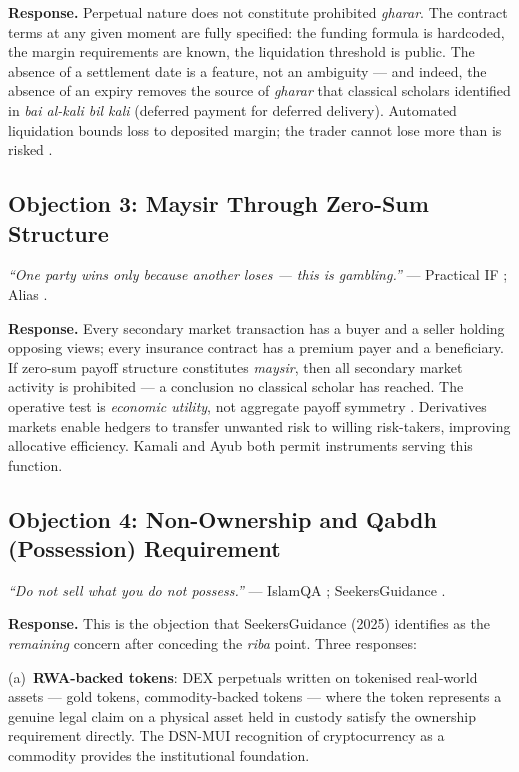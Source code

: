 \documentclass[10pt,twocolumn]{article}
\begin{document}
\textbf{Response.} Perpetual nature does not constitute prohibited
\textit{gharar}. The contract terms at any given moment are fully specified: the
funding formula is hardcoded, the margin requirements are known, the liquidation
threshold is public. The absence of a settlement date is a feature, not an
ambiguity --- and indeed, the absence of an expiry removes the source of
\textit{gharar} that classical scholars identified in \textit{bai al-kali bil
kali} (deferred payment for deferred delivery). Automated liquidation bounds
loss to deposited margin; the trader cannot lose more than is risked
\cite{Kamali2000,Elhessi2018}.

\subsection{Objection 3: Maysir Through Zero-Sum Structure}

\emph{``One party wins only because another loses --- this is gambling.''}
--- Practical IF \cite{PracticalIF2023}; Alias \cite{Alias2021}.

\textbf{Response.} Every secondary market transaction has a buyer and a seller
holding opposing views; every insurance contract has a premium payer and a
beneficiary. If zero-sum payoff structure constitutes \textit{maysir}, then
all secondary market activity is prohibited --- a conclusion no classical scholar
has reached. The operative test is \emph{economic utility}, not aggregate payoff
symmetry \cite{Ayub2007,ElGamal2006}. Derivatives markets enable hedgers to
transfer unwanted risk to willing risk-takers, improving allocative efficiency.
Kamali \cite{Kamali2000} and Ayub \cite{Ayub2007} both permit instruments
serving this function.

\subsection{Objection 4: Non-Ownership and Qabdh (Possession) Requirement}

\emph{``Do not sell what you do not possess.''} --- IslamQA \cite{IslamQA2023};
SeekersGuidance \cite{SeekersGuidance2025}.

\textbf{Response.} This is the objection that SeekersGuidance (2025) identifies
as the \emph{remaining} concern after conceding the \textit{riba} point. Three
responses:

(a)~\textbf{RWA-backed tokens}: DEX perpetuals written on tokenised real-world
assets --- gold tokens, commodity-backed tokens --- where the token represents a
genuine legal claim on a physical asset held in custody satisfy the ownership
requirement directly. The DSN-MUI \cite{DSNMUI2021} recognition of
cryptocurrency as a commodity provides the institutional foundation.
\end{document}
